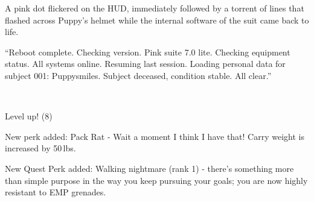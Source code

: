 
A pink dot flickered on the HUD, immediately followed by a torrent of lines that flashed across Puppy's helmet while the internal software of the suit came back to life.

{\mten ``Reboot complete. Checking version. Pink suite 7.0 lite. Checking equipment status. All systems online. Resuming last session. Loading personal data for subject 001: Puppysmiles. Subject deceased, condition stable. All clear.''}

\clearpage

~\vfill

\begin{engnote}
		Level up! (8)
	
		New perk added: Pack Rat - Wait a moment I think I have that! Carry weight is increased by 50\,lbs.
	
		New Quest Perk added: Walking nightmare (rank 1) - there's something more than simple purpose in the way you keep pursuing your goals; you are now highly resistant to EMP grenades.
\end{engnote}

